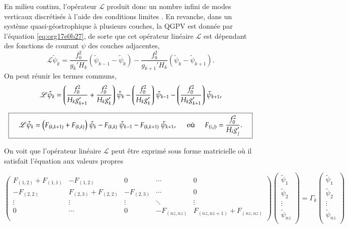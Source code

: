 \documentclass[10pt]{article}
\numberwithin{equation}{section}
\newcommand{\tpsi}{\tilde{\psi}}
\begin{document}
En milieu continu, l'opérateur \(\mathscr{L}\) produit donc un nombre infini de modes verticaux discrétisés à l'aide des conditions limites \citep[p.468]{vallis_2006}.
En revanche, dans un système quasi-géostrophique à plusieurs couches, la QGPV est donnée par l'équation \ref{eq:org17e0b27}, de sorte que cet opérateur linéaire \(\mathscr{L}\) est dépendant des fonctions de courant \(\psi\) des couches adjacentes,
\begin{equation}
\mathscr{L}\tpsi_k = \frac{f_0^2}{g_k' H_k} (\tpsi_{k-1} - \tpsi_k) - \frac{f_0^2}{g_{k+1}'H_k} (\tpsi_k - \tpsi_{k+1}).
\end{equation}
On peut réunir les termes communs,
\begin{align}
\mathscr{L} \tpsi_k = \qty( \frac{f_0^2}{H_k g'_{k+1}} + \frac{f_0^2}{H_k g'_{k}} )\ \tpsi_k
- \qty(\frac{f_0^2}{H_k g'_{k}})\ \tpsi_{k-1}
- \qty(\frac{f_0^2}{H_k g'_{k+1}})\ \tpsi_{k+1},\nonumber
\end{align}

\begin{equation}
\boxed{\hspace{0.4cm}
\mathscr{L}\tpsi_k = \qty( F_{(k,k+1)} + F_{(k,k)}) \ \tpsi_k
- F_{(k,k)}\ \tpsi_{k-1}
- F_{(k,k+1)}\ \tpsi_{k+1},
\hspace{0.5cm}\text{où}\hspace{0.5cm}
F_{(i,j)} = \frac{f_0^2}{H_i g'_j}.
\hspace{0.4cm} }
\end{equation}

On voit que l'opérateur linéaire \(\mathscr{L}\) peut être exprimé sous forme matricielle où il satisfait l'équation aux valeurs propres

\[
\begin{pmatrix}
 F_{(1,2)} + F_{(1,1)} & -F_{(1,2)} & 0 & \cdots & 0 \\[0pt]
 -F_{(2,2)} & F_{(2,3)} + F_{(2,2)} & -F_{(2,3)} & \cdots & 0 \\[0pt]
 \vdots & \vdots & \vdots & \ddots & \vdots \\[0pt]
 0 & \cdots & 0 & -F_{(nz,nz)} & F_{(nz,nz+1)} + F_{(nz,nz)} \\[0pt]
\end{pmatrix}
\begin{pmatrix}
 \tpsi_1 \\[0pt]
 \tpsi_2 \\[0pt]
 \vdots \\[0pt]
 \tpsi_{nz} \\[0pt]
\end{pmatrix}
=\Gamma_k\begin{pmatrix}
 \tpsi_1 \\[0pt]
 \tpsi_2 \\[0pt]
 \vdots \\[0pt]
 \tpsi_{nz} \\[0pt]
\end{pmatrix}
\]
\end{document}
